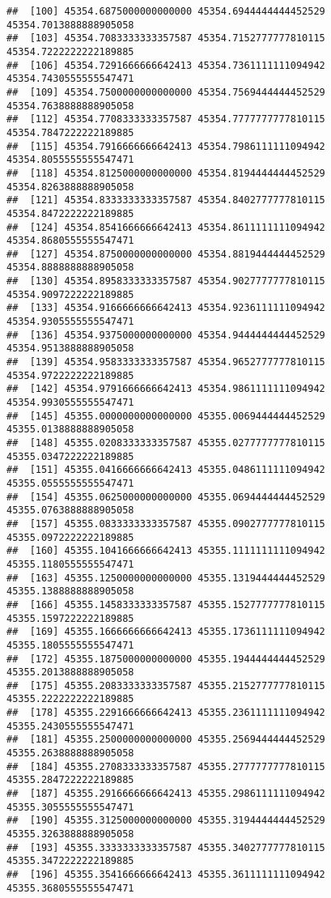 \documentclass[
]{article}
\begin{document}
\begin{verbatim}
##  [100] 45354.6875000000000000 45354.6944444444452529 45354.7013888888905058
##  [103] 45354.7083333333357587 45354.7152777777810115 45354.7222222222189885
##  [106] 45354.7291666666642413 45354.7361111111094942 45354.7430555555547471
##  [109] 45354.7500000000000000 45354.7569444444452529 45354.7638888888905058
##  [112] 45354.7708333333357587 45354.7777777777810115 45354.7847222222189885
##  [115] 45354.7916666666642413 45354.7986111111094942 45354.8055555555547471
##  [118] 45354.8125000000000000 45354.8194444444452529 45354.8263888888905058
##  [121] 45354.8333333333357587 45354.8402777777810115 45354.8472222222189885
##  [124] 45354.8541666666642413 45354.8611111111094942 45354.8680555555547471
##  [127] 45354.8750000000000000 45354.8819444444452529 45354.8888888888905058
##  [130] 45354.8958333333357587 45354.9027777777810115 45354.9097222222189885
##  [133] 45354.9166666666642413 45354.9236111111094942 45354.9305555555547471
##  [136] 45354.9375000000000000 45354.9444444444452529 45354.9513888888905058
##  [139] 45354.9583333333357587 45354.9652777777810115 45354.9722222222189885
##  [142] 45354.9791666666642413 45354.9861111111094942 45354.9930555555547471
##  [145] 45355.0000000000000000 45355.0069444444452529 45355.0138888888905058
##  [148] 45355.0208333333357587 45355.0277777777810115 45355.0347222222189885
##  [151] 45355.0416666666642413 45355.0486111111094942 45355.0555555555547471
##  [154] 45355.0625000000000000 45355.0694444444452529 45355.0763888888905058
##  [157] 45355.0833333333357587 45355.0902777777810115 45355.0972222222189885
##  [160] 45355.1041666666642413 45355.1111111111094942 45355.1180555555547471
##  [163] 45355.1250000000000000 45355.1319444444452529 45355.1388888888905058
##  [166] 45355.1458333333357587 45355.1527777777810115 45355.1597222222189885
##  [169] 45355.1666666666642413 45355.1736111111094942 45355.1805555555547471
##  [172] 45355.1875000000000000 45355.1944444444452529 45355.2013888888905058
##  [175] 45355.2083333333357587 45355.2152777777810115 45355.2222222222189885
##  [178] 45355.2291666666642413 45355.2361111111094942 45355.2430555555547471
##  [181] 45355.2500000000000000 45355.2569444444452529 45355.2638888888905058
##  [184] 45355.2708333333357587 45355.2777777777810115 45355.2847222222189885
##  [187] 45355.2916666666642413 45355.2986111111094942 45355.3055555555547471
##  [190] 45355.3125000000000000 45355.3194444444452529 45355.3263888888905058
##  [193] 45355.3333333333357587 45355.3402777777810115 45355.3472222222189885
##  [196] 45355.3541666666642413 45355.3611111111094942 45355.3680555555547471

\end{verbatim}
\end{document}
